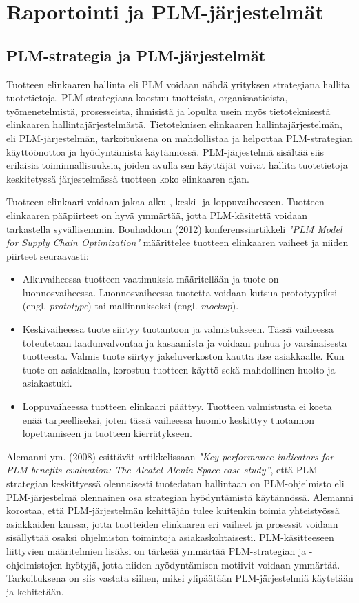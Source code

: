 \chapter{Raportointi ja PLM-järjestelmät} \label{Raportointi ja PLM}

\section{PLM-strategia ja PLM-järjestelmät} \label{PLM-strategia ja PLM-järjestelmät}

Tuotteen elinkaaren hallinta eli PLM voidaan nähdä yrityksen strategiana hallita tuotetietoja. PLM strategiana koostuu tuotteista, organisaatioista, työmenetelmistä, prosesseista, ihmisistä ja lopulta usein myös tietoteknisestä elinkaaren hallintajärjestelmästä. Tietoteknisen elinkaaren hallintajärjestelmän, eli PLM-järjestelmän, tarkoituksena on mahdollistaa ja helpottaa PLM-strategian käyttöönottoa ja hyödyntämistä käytännössä. PLM-järjestelmä sisältää siis erilaisia toiminnallisuuksia, joiden avulla sen käyttäjät voivat hallita tuotetietoja keskitetyssä järjestelmässä tuotteen koko elinkaaren ajan.

Tuotteen elinkaari voidaan jakaa alku-, keski- ja loppuvaiheeseen. Tuotteen elinkaaren pääpiirteet on hyvä ymmärtää, jotta PLM-käsitettä voidaan tarkastella syvällisemmin. Bouhaddoun (2012) konferenssiartikkeli \textit{"PLM Model for Supply Chain Optimization"} määrittelee tuotteen elinkaaren vaiheet ja niiden piirteet seuraavasti:  \cite{bouhaddou_plm_2012}
\begin{itemize}
\item Alkuvaiheessa tuotteen vaatimuksia määritellään ja tuote on luonnosvaiheessa. Luonnosvaiheessa tuotetta voidaan kutsua prototyypiksi (engl. \textit{prototype}) tai mallinnukseksi (engl. \textit{mockup}).
\item Keskivaiheessa tuote siirtyy tuotantoon ja valmistukseen. Tässä vaiheessa toteutetaan laadunvalvontaa ja kasaamista ja voidaan puhua jo varsinaisesta tuotteesta. Valmis tuote siirtyy jakeluverkoston kautta itse asiakkaalle. Kun tuote on asiakkaalla, korostuu tuotteen käyttö sekä mahdollinen huolto ja asiakastuki.
\item Loppuvaiheessa tuotteen elinkaari päättyy. Tuotteen valmistusta ei koeta enää tarpeelliseksi, joten tässä vaiheessa huomio keskittyy tuotannon lopettamiseen ja tuotteen kierrätykseen.
\end{itemize}
Alemanni ym. (2008) esittävät artikkelissaan \textit{"Key performance indicators for PLM benefits evaluation: The Alcatel Alenia Space case study”}, että PLM-strategian keskittyessä olennaisesti tuotedatan hallintaan on PLM-ohjelmisto eli PLM-järjestelmä olennainen osa strategian hyödyntämistä käytännössä.  \cite{alemanni_key_2008} Alemanni korostaa, että PLM-järjestelmän kehittäjän tulee kuitenkin toimia yhteistyössä asiakkaiden kanssa, jotta tuotteiden elinkaaren eri vaiheet ja prosessit voidaan sisällyttää osaksi ohjelmiston toimintoja asiakaskohtaisesti. PLM-käsitteeseen liittyvien määritelmien lisäksi on tärkeää ymmärtää PLM-strategian ja -ohjelmistojen hyötyjä, jotta niiden hyödyntämisen motiivit voidaan ymmärtää. Tarkoituksena on siis vastata siihen, miksi ylipäätään PLM-järjestelmiä käytetään ja kehitetään.

